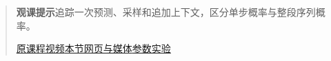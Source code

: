 \begin{quote}\small\textbf{观课提示}\quad 追踪一次预测、采样和追加上下文，区分单步概率与整段序列概率。

\href{https://www.youtube.com/watch?v=LPZh9BOjkQs}{原课程视频}\quad\href{https://vitael04213.github.io/3blue1brown-notes/lessons/mini-llm.html}{本节网页与媒体}\quad\href{https://vitael04213.github.io/3blue1brown-notes/lab.html\#attention}{参数实验}
\end{quote}
